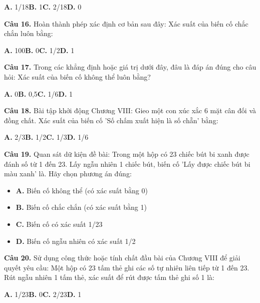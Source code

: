 \documentclass[11pt,a4paper]{article}
\begin{document}
\hspace*{1.5em}\textbf{A.} 1/18\quad\quad \textbf{B.} 1\quad\quad \textbf{C.} 2/18\quad\quad \textbf{D.} 0\par\vspace{2pt}
\textbf{\color{primary} Câu 16.} Hoàn thành phép xác định cơ bản sau đây: Xác suất của biến cố chắc chắn luôn bằng:\par
\hspace*{1.5em}\textbf{A.} 100\quad\quad \textbf{B.} 0\quad\quad \textbf{C.} 1/2\quad\quad \textbf{D.} 1\par\vspace{2pt}
\textbf{\color{primary} Câu 17.} Trong các khẳng định hoặc giá trị dưới đây, đâu là đáp án đúng cho câu hỏi: Xác suất của biến cố không thể luôn bằng?\par
\hspace*{1.5em}\textbf{A.} 0\quad\quad \textbf{B.} 0,5\quad\quad \textbf{C.} 1/6\quad\quad \textbf{D.} 1\par\vspace{2pt}
\textbf{\color{primary} Câu 18.} Bài tập khởi động Chương VIII: Gieo một con xúc xắc 6 mặt cân đối và đồng chất. Xác suất của biến cố 'Số chấm xuất hiện là số chẵn' bằng:\par
\hspace*{1.5em}\textbf{A.} 2/3\quad\quad \textbf{B.} 1/2\quad\quad \textbf{C.} 1/3\quad\quad \textbf{D.} 1/6\par\vspace{2pt}
\textbf{\color{primary} Câu 19.} Quan sát dữ kiện đề bài: Trong một hộp có 23 chiếc bút bi xanh được đánh số từ 1 đến 23. Lấy ngẫu nhiên 1 chiếc bút, biến cố 'Lấy được chiếc bút bi màu xanh' là. Hãy chọn phương án đúng:\par
\begin{itemize}\setlength{\itemsep}{1pt}\setlength{\parskip}{0pt}
  \item[] \textbf{A.} Biến cố không thể (có xác suất bằng 0)
  \item[] \textbf{B.} Biến cố chắc chắn (có xác suất bằng 1)
  \item[] \textbf{C.} Biến cố có xác suất 1/23
  \item[] \textbf{D.} Biến cố ngẫu nhiên có xác suất 1/2
\end{itemize}\vspace{2pt}
\textbf{\color{primary} Câu 20.} Sử dụng công thức hoặc tính chất đầu bài của Chương VIII để giải quyết yêu cầu: Một hộp có 23 tấm thẻ ghi các số tự nhiên liên tiếp từ 1 đến 23. Rút ngẫu nhiên 1 tấm thẻ, xác suất để rút được tấm thẻ ghi số 1 là:\par
\hspace*{1.5em}\textbf{A.} 1/23\quad\quad \textbf{B.} 0\quad\quad \textbf{C.} 2/23\quad\quad \textbf{D.} 1\par\vspace{2pt}
\end{document}
